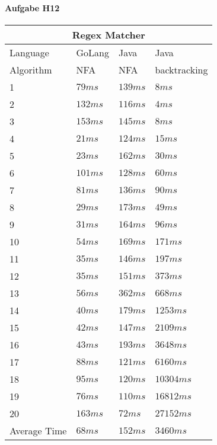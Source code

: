 \documentclass[11pt]{article}
\begin{document}
%
%
\paragraph{Aufgabe H12}
\begin{center}
\begin{tabular}{ |p{3cm}||p{2cm}|p{2cm}|p{2cm}|  }
 \hline
 \multicolumn{4}{|c|}{Regex Matcher} \\
 \hline
 Language & GoLang & Java & Java\\
 \hline
 Algorithm & NFA & NFA & backtracking\\
 \hline
 1	&	$79 ms$	&	$139 ms$	&	$8 ms$\\
 2	&	$132 ms$	&	$116 ms$	&	$4 ms$\\
 3	&	$153 ms$	&	$145 ms$	&	$8 ms$\\
 4	&	$21 ms$	&	$124 ms$	&	$15 ms$\\
 5	&	$23 ms$	&	$162 ms$	&	$30 ms$\\
 6	&	$101 ms$	&	$128 ms$	&	$60 ms$\\
 7	&	$81 ms$	&	$136 ms$	&	$90 ms$\\
 8	&	$29 ms$	&	$173 ms$	&	$49 ms$\\
 9	&	$31 ms$	&	$164 ms$	&	$96 ms$\\
 10	&	$54 ms$	&	$169 ms$	&	$171 ms$\\
 11	&	$35 ms$	&	$146 ms$	&	$197 ms$\\
 12	&	$35 ms$	&	$151 ms$	&	$373 ms$\\
 13	&	$56 ms$	&	$362 ms$	&	$668 ms$\\
 14	&	$40 ms$	&	$179 ms$	&	$1253 ms$\\
 15	&	$42 ms$	&	$147 ms$	&	$2109 ms$\\
 16	&	$43 ms$	&	$193 ms$	&	$3648 ms$\\
 17	&	$88 ms$	&	$121 ms$	&	$6160 ms$\\
 18	&	$95 ms$	&	$120 ms$	&	$10304 ms$\\
 19	&	$76 ms$	&	$110 ms$	&	$16812 ms$\\
 20	&	$163 ms$	&	$72 ms$	&	$27152 ms$\\
 \hline
 Average Time	&	$68 ms$	&	$152 ms$	&	$3460 ms$\\
 \hline
\end{tabular}
\end{center}
\end{document}
